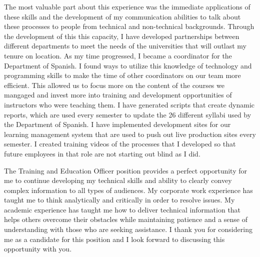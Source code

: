 \documentclass[12pt, letterpaper]{awesome-cv} %
\begin{document}
\begin{cvletter}
The most valuable part about this experience was the immediate applications of these skills and the development of my communication abilities to talk about these processes to people from technical and non-technical backgrounds. Through the development of this this capacity, I have developed partnerships between different departments  to meet the needs of the universities that will outlast my tenure on location. As my time progressed, I became a coordinator for the Department of Spanish. I found ways to utilize this knowledge of technology and programming skills to make the time of other coordinators on our team more efficient. This allowed us to focus more on the content of the courses we mangaged and invest more into training and development opportunities of instructors who were teaching them. I have generated scripts that create dynamic reports, which are used every semester to update the 26 different syllabi used by the Department of Spanish. I have implemented development sites for our learning management system that are used to push out live production sites every semester. I created training videos of the processes that I developed so that future employees in that role are not starting out blind as I did.

The Training and Education Officer position provides a perfect opportunity for me to continue developing my technical skills and ability to clearly convey complex information to all types of audiences. My corporate work experience has taught me to think analytically and critically in order to resolve issues. My academic experience has taught me how to deliver technical information that helps others overcome their obstacles while maintaining patience and a sense of understanding with those who are seeking assistance. I thank you for considering me as a candidate for this position and I look forward to discussing this opportunity with you.



\end{cvletter}


\makeletterclosing %
\end{document}
